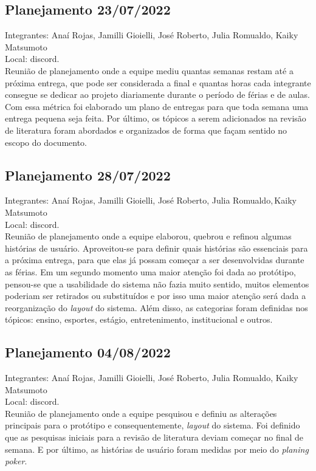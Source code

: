 \subsection{Planejamento 23/07/2022}
\noindent Integrantes: Anaí Rojas, Jamilli Gioielli, José Roberto, Julia Romualdo, Kaiky Matsumoto \\
Local: \gls{discord}. \\
Reunião de planejamento onde a equipe mediu quantas semanas restam até a próxima entrega, que pode ser considerada a final e quantas horas cada integrante consegue se dedicar ao projeto diariamente durante o período de férias e de aulas. Com essa métrica foi elaborado um plano de entregas para que toda semana uma entrega pequena seja feita. Por último, os tópicos a serem adicionados na revisão de literatura foram abordados e organizados de forma que façam sentido no escopo do documento.

\subsection{Planejamento 28/07/2022}
\noindent Integrantes: Anaí Rojas, Jamilli Gioielli, José Roberto, Julia Romualdo,\,Kaiky Matsumoto \\
Local: \gls{discord}. \\
Reunião de planejamento onde a equipe elaborou, quebrou e refinou algumas histórias de usuário. Aproveitou-se para definir quais histórias são essenciais para a próxima entrega, para que elas já possam começar a ser desenvolvidas durante as férias. Em um segundo momento uma maior atenção foi dada ao protótipo, pensou-se que a usabilidade do sistema não fazia muito sentido, muitos elementos poderiam ser retirados ou substituídos e por isso uma maior atenção será dada a reorganização do \textit{layout} do sistema. Além disso, as categorias foram definidas nos tópicos: ensino, esportes, estágio, entretenimento, institucional e outros.

\subsection{Planejamento 04/08/2022}
\noindent Integrantes: Anaí Rojas, Jamilli Gioielli, José Roberto, Julia Romualdo, Kaiky Matsumoto \\
Local: \gls{discord}. \\
Reunião de planejamento onde a equipe pesquisou e definiu as alterações principais para o protótipo e consequentemente, \textit{layout} do sistema. Foi definido que as pesquisas iniciais para a revisão de literatura deviam começar no final de semana. E por último, as histórias de usuário foram medidas por meio do \textit{planing poker}.  

